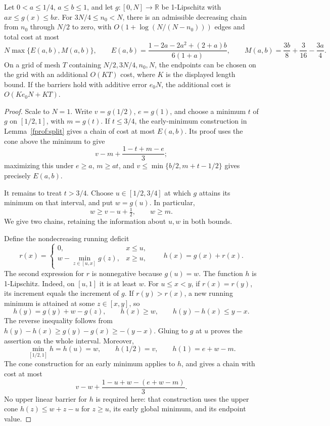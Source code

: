 \begin{lemma}\label{fprof:reflection}
Let \(0<a\leq1/4\), \(a\leq b\leq1\), and let
\(g:[0,N]\to\mathbb R\) be 1-Lipschitz with
\(ax\leq g(x)\leq bx\). For \(3N/4\leq n_0<N\), there is an
admissible decreasing chain from \(n_0\) through \(N/2\) to zero,
with \(O(1+\log(N/(N-n_0)))\) edges and total cost at most
$$
 N\max\{E(a,b),M(a,b)\},\qquad
 E(a,b)=\frac{1-2a-2a^2+(2+a)b}{6(1+a)},\qquad
 M(a,b)=\frac{3b}{8}+\frac3{16}-\frac{3a}{4}.
$$
On a grid of mesh \(T\) containing \(N/2,3N/4,n_0,N\), the endpoints
can be chosen on the grid with an additional \(O(KT)\) cost, where \(K\)
is the displayed length bound. If the barriers hold with additive error
\(e_0N\), the additional cost is \(O(Ke_0N+KT)\).
\end{lemma}
\begin{proof}
Scale to \(N=1\). Write \(v=g(1/2)\), \(e=g(1)\), and choose
a minimum \(t\) of \(g\) on \([1/2,1]\), with \(m=g(t)\).
If \(t\leq3/4\), the early-minimum construction in
Lemma~\ref{fprof:split} gives a chain of cost at most \(E(a,b)\).
Its proof uses the cone above the minimum to give
$$
 v-m+\frac{1-t+m-e}{3};
$$
maximizing this under
\(e\geq a\), \(m\geq at\), and
\(v\leq\min\{b/2,m+t-1/2\}\) gives precisely \(E(a,b)\).

It remains to treat \(t>3/4\). Choose \(u\in[1/2,3/4]\) at which
\(g\) attains its minimum on that interval, and put \(w=g(u)\).
In particular,
\begin{equation}\label{fprof:headconstraint}
 w\geq v-u+\tfrac12,\qquad w\geq m.
\end{equation}
We give two chains, retaining the information about \(u,w\) in both bounds.

Define the nondecreasing running deficit
$$
 r(x)=\begin{cases}
 0,&x\leq u,\\
 w-\min_{z\in[u,x]}g(z),&x\geq u,
 \end{cases}
 \qquad h(x)=g(x)+r(x).
$$
The second expression for \(r\) is nonnegative because \(g(u)=w\).
The function \(h\) is 1-Lipschitz. Indeed, on \([u,1]\) it is at least
\(w\). For \(u\leq x<y\), if \(r(x)=r(y)\), its increment equals the
increment of \(g\). If \(r(y)>r(x)\), a new running minimum is attained
at some \(z\in[x,y]\), so
$$
 h(y)=g(y)+w-g(z),\qquad h(x)\geq w,
 \qquad h(y)-h(x)\leq y-x.
$$
The reverse inequality follows from
\(h(y)-h(x)\geq g(y)-g(x)\geq-(y-x)\).
Gluing to \(g\) at \(u\) proves the assertion on the whole interval.
Moreover,
$$
 \min_{[1/2,1]}h=h(u)=w,\qquad h(1/2)=v,\qquad
 h(1)=e+w-m.
$$
The cone construction for an early minimum applies to \(h\), and gives
a chain with cost at most
$$
 v-w+\frac{1-u+w-(e+w-m)}3.
$$
No upper linear barrier for \(h\) is required here: that construction
uses the upper cone \(h(z)\leq w+z-u\) for \(z\geq u\), its early
global minimum, and its endpoint value.


\end{proof}
